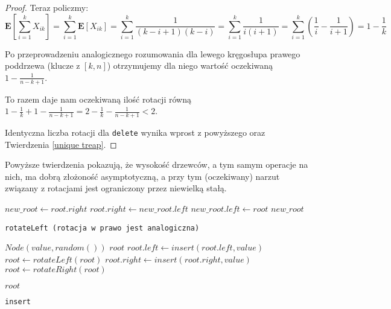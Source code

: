 \begin{proof}
Teraz policzmy:
$$
\mathbf{E}\left[\sum_{i=1}^{k}X_{ik}\right]=
\sum_{i=1}^{k}\mathbf{E}\left[X_{ik}\right]=
\sum_{i=1}^{k}\frac{1}{(k-i+1)(k-i)}=
\sum_{i=1}^{k}\frac{1}{i(i+1)}=
\sum_{i=1}^{k}(\frac{1}{i}-\frac{1}{i+1})=
1-\frac{1}{k}
$$

Po przeprowadzeniu analogicznego rozumowania dla lewego kręgosłupa prawego poddrzewa (klucze z $[k,n]$) otrzymujemy dla niego wartość oczekiwaną $1 - \frac{1}{n-k+1}$.

To razem daje nam oczekiwaną ilość rotacji równą $1 - \frac{1}{k} + 1 - \frac{1}{n-k+1} = 2 -  \frac{1}{k} - \frac{1}{n-k+1} < 2$.

Identyczna liczba rotacji dla \texttt{delete} wynika wprost z powyższego oraz Twierdzenia \ref{unique treap}.
\end{proof}

Powyższe twierdzenia pokazują, że wysokość drzewców, a tym samym operacje na nich, ma dobrą złożoność asymptotyczną, a przy tym (oczekiwany) narzut związany z rotacjami jest ograniczony przez niewielką stałą.

\newpage

\begin{algorithm}
  \DontPrintSemicolon


  $new\_root \leftarrow root.right$\;
  $root.right \leftarrow new\_root.left$\;
  $new\_root.left \leftarrow root$\;
  \Return $new\_root$\;
  
  \caption{\texttt{rotateLeft (rotacja w prawo jest analogiczna)}}
  \label{treap-rotate-left}
\end{algorithm}

\begin{algorithm}
  \DontPrintSemicolon

  {
    \Return $Node(value, random())$\;
  }
  {
    \Return $root$\;
  }
  {
    $root.left \leftarrow insert(root.left, value)$\;
    {
      $root \leftarrow rotateLeft(root)$\;
    }
  }
  {
    $root.right \leftarrow insert(root.right, value)$\;
    {
      $root \leftarrow rotateRight(root)$\;
    }
  }
  
  \Return $root$\;
  \caption{\texttt{insert}}
  \label{treap-insert}
\end{algorithm}

